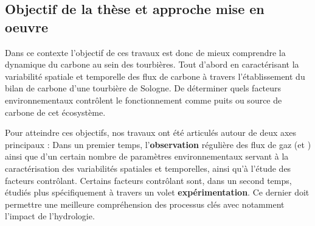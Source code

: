 %
%
%
%
%



\subsection*{Objectif de la thèse et approche mise en oeuvre}


Dans ce contexte l'objectif de ces travaux est donc de mieux comprendre la dynamique du carbone au sein des tourbières.
Tout d'abord en caractérisant la variabilité spatiale et temporelle des flux de carbone à travers l'établissement du bilan de carbone d'une tourbière de Sologne.
De déterminer quels facteurs environnementaux contrôlent le fonctionnement comme puits ou source de carbone de cet écosystème.

Pour atteindre ces objectifs, nos travaux ont été articulés autour de deux axes principaux :
Dans un premier temps, l'\textbf{observation} régulière des flux de gaz (\coo et \chh) ainsi que d'un certain nombre de paramètres environnementaux servant à la caractérisation des variabilités spatiales et temporelles, ainsi qu'à l'étude des facteurs contrôlant.
Certains facteurs contrôlant sont, dans un second temps, étudiés plus spécifiquement à travers un volet \textbf{expérimentation}.
Ce dernier doit permettre une meilleure compréhension des processus clés avec notamment l'impact de l'hydrologie.


